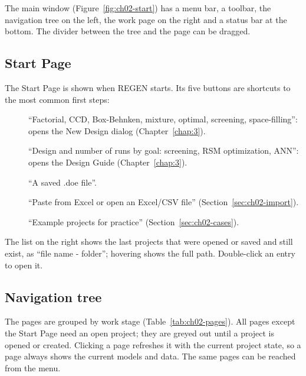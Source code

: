 The main window (Figure~\ref{fig:ch02-start}) has a menu bar, a toolbar, the navigation tree on the left, the work
page on the right and a status bar at the bottom. The divider between the tree and the page can be dragged.

\subsection{Start Page}
The Start Page is shown when REGEN starts. Its five buttons are shortcuts to the most common first steps:
\begin{description}
  \item[] ``Factorial, CCD, Box-Behnken, mixture, optimal, screening, space-filling'': opens the
        New Design dialog (Chapter~\ref{chap:3}).
  \item[] ``Design and number of runs by goal: screening, RSM optimization, ANN'': opens the
        Design Guide (Chapter~\ref{chap:3}).
  \item[] ``A saved .doe file''.
  \item[] ``Paste from Excel or open an Excel/CSV file'' (Section~\ref{sec:ch02-import}).
  \item[] ``Example projects for practice'' (Section~\ref{sec:ch02-cases}).
\end{description}
The list  on the right shows the last projects that were opened or saved and still exist, as
``file name - folder''; hovering shows the full path. Double-click an entry to open it.

\subsection{Navigation tree}
\label{sec:ch02-tree}
The pages are grouped by work stage (Table~\ref{tab:ch02-pages}). All pages except the Start Page need an open
project; they are greyed out until a project is opened or created. Clicking a page refreshes it with the current
project state, so a page always shows the current models and data. The same pages can be reached from the
 menu.

